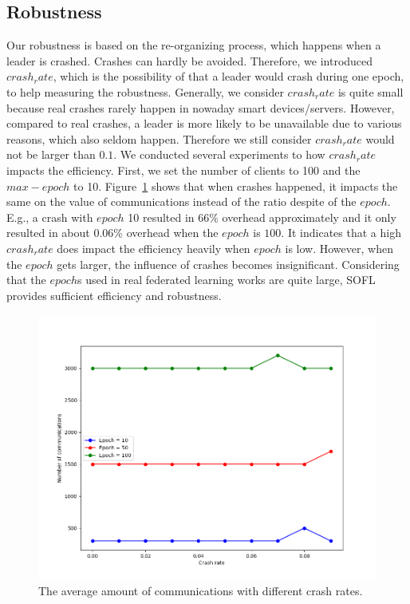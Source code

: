 \subsection{Robustness}
Our robustness is based on the re-organizing process, which happens when a leader is crashed. Crashes can hardly be avoided. Therefore, we introduced $crash_rate$, which is the possibility of that a leader would crash during one epoch, to help measuring the robustness. Generally, we consider $crash_rate$ is quite small because real crashes rarely happen in nowaday smart devices/servers. However, compared to real crashes, a leader is more likely to be unavailable due to various reasons, which also seldom happen. Therefore we still consider $crash_rate$ would not be larger than $0.1$. We conducted several experiments to how $crash_rate$ impacts the efficiency. First, we set the number of clients to 100 and the $max-epoch$ to 10. Figure~\ref{comm-crash} shows that when crashes happened, it impacts the same on the value of communications instead of the ratio despite of the $epoch$. E.g., a crash with $epoch$ 10 resulted in $66\%$ overhead approximately and it only resulted in about $0.06\%$ overhead when the $epoch$ is $100$. It indicates that a high $crash_rate$ does impact the efficiency heavily when $epoch$ is low. However, when the $epoch$ gets larger, the influence of crashes becomes insignificant. Considering that the $epoch$s used in real federated learning works are quite large, SOFL provides sufficient efficiency and robustness.

\begin{figure}[!ht]
    \centering
    \includegraphics[width=\columnwidth]{img/comm-crash.png}
    \caption{The average amount of communications with different crash rates.}
    \label{comm-crash}
\end{figure}

